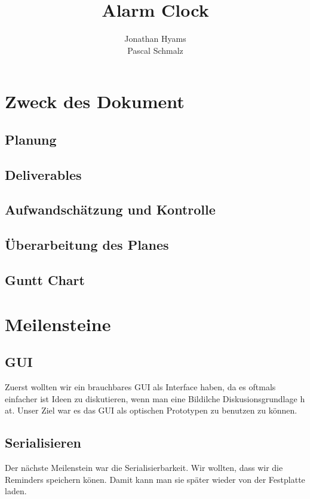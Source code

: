 \documentclass[11pt,titelpage]{scrartcl}
\title{Alarm Clock }
\author{Jonathan Hyams \\Pascal Schmalz}
\begin{document}
\thispagestyle{empty}
\maketitle
\pagebreak
\tableofcontents

\pagestyle{fancy}


\begin{abstract}
\end{abstract}
\pagebreak


\section{Zweck des Dokument}
\subsection{Planung}

\subsection{Deliverables}
\subsection{Aufwandschätzung und Kontrolle}
\subsection{Überarbeitung des Planes}
\subsection{Guntt Chart}
\section{Meilensteine}
\subsection{GUI}
Zuerst wollten wir ein brauchbares GUI als Interface haben, da es oftmals einfacher ist Ideen zu diskutieren, wenn man eine Bildilche Diskusionsgrundlage h at. Unser Ziel war es das GUI als optischen Prototypen zu benutzen zu können.

\subsection{Serialisieren}
Der nächste Meilenstein war die Serialisierbarkeit. Wir wollten, dass wir die Reminders speichern könen. Damit kann man sie später wieder von der Festplatte laden.
\end{document}
